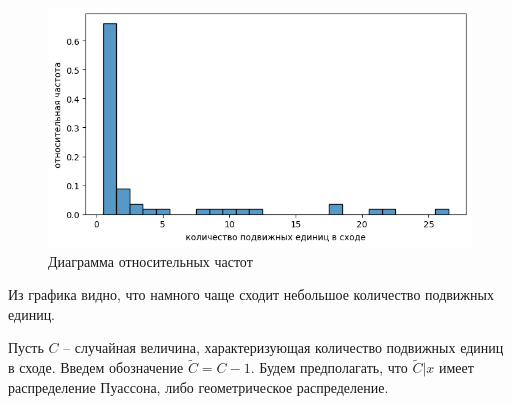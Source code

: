 \begin{figure}[H]
    \begin{center}
        \includegraphics[width=1.0\linewidth]{src/img/KDE.png}
        \caption{Диаграмма относительных частот}
        \label{fig:kde}
    \end{center}
\end{figure}

Из графика видно, что намного чаще сходит небольшое количество подвижных единиц.


Пусть $C$ -- случайная величина, характеризующая количество подвижных единиц в сходе. Введем обозначение $\tilde{C} = C - 1$. Будем предполагать, что $\tilde{C}|x$ имеет распределение Пуассона, либо геометрическое распределение.



